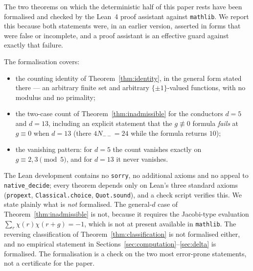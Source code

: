 \documentclass[11pt,reqno]{amsart}
\theoremstyle{plain}
\theoremstyle{definition}
\begin{document}
The two theorems on which the deterministic half of this paper rests have been
formalised and checked by the Lean~4 proof assistant against
\texttt{mathlib}. We report this because both statements were, in an earlier
version, asserted in forms that were false or incomplete, and a proof
assistant is an effective guard against exactly that failure.

The formalisation covers:
\begin{itemize}
\item the counting identity of Theorem~\ref{thm:identity}, in the general form
      stated there --- an arbitrary finite set and arbitrary $\{\pm 1\}$-valued
      functions, with no modulus and no primality;
\item the two-case count of Theorem~\ref{thm:inadmissible} for the conductors
      $d = 5$ and $d = 13$, including an explicit statement that the
      $g \not\equiv 0$ formula \emph{fails} at $g \equiv 0$ when $d = 13$
      (there $4N_{--} = 24$ while the formula returns $10$);
\item the vanishing pattern: for $d = 5$ the count vanishes exactly on
      $g \equiv 2, 3 \pmod 5$, and for $d = 13$ it never vanishes.
\end{itemize}

\sloppypar
The Lean development contains no \texttt{sorry}, no additional axioms and no
appeal to \texttt{native\_decide}; every theorem depends only on Lean's three
standard axioms (\texttt{propext}, \texttt{Classical.choice},
\texttt{Quot.sound}), and a check script verifies this. We state plainly what
is \emph{not} formalised. The general-$d$ case of
Theorem~\ref{thm:inadmissible} is not, because it requires the Jacobi-type
evaluation $\sum_r \chi(r)\chi(r+g) = -1$, which is not at present available
in \texttt{mathlib}. The reversing classification of
Theorem~\ref{thm:classification} is not formalised either, and no empirical
statement in
Sections~\ref{sec:computation}--\ref{sec:delta} is formalised. The
formalisation is a check on the two most error-prone statements, not a
certificate for the paper.
\end{document}
